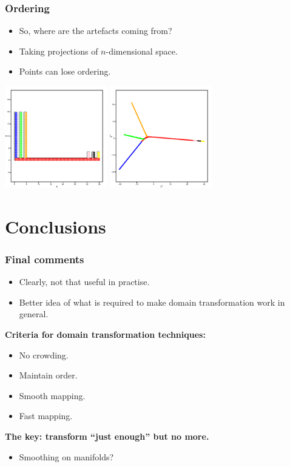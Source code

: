\documentclass[ignorenonframetext]{beamer} %
\newcommand{\bc}{\begin{center}}
\newcommand{\ec}{\end{center}}
\newcommand{\bi}{\begin{itemize}}
\newcommand{\ei}{\end{itemize}}
\begin{document}
\begin{frame}
	\frametitle{Ordering}
	\bi
		\item So, where are the artefacts coming from?
		\item Taking projections of $n$-dimensional space.
		\item Points can lose ordering.
	\ei
	\centering
              \includegraphics[height=1.75in]{figs/comb.pdf} \includegraphics[height=1.75in]{figs/comb-2d.pdf}
\end{frame}

\section{Conclusions}

\begin{frame}
	\frametitle{Final comments}
		\bi
			\item Clearly, not that useful in practise.
			\item Better idea of what is required to make domain transformation work in general.
		\ei
		\textbf{Criteria for domain transformation techniques:}
          \bi
            \item No crowding.
            \item Maintain order.
            \item Smooth mapping.
            \item Fast mapping.
           \ei
         \bc \textbf{The key: transform ``just enough'' but no more.} \ec
         \bi
         		\item Smoothing on manifolds?
        \ei
\end{frame}
\end{document}
